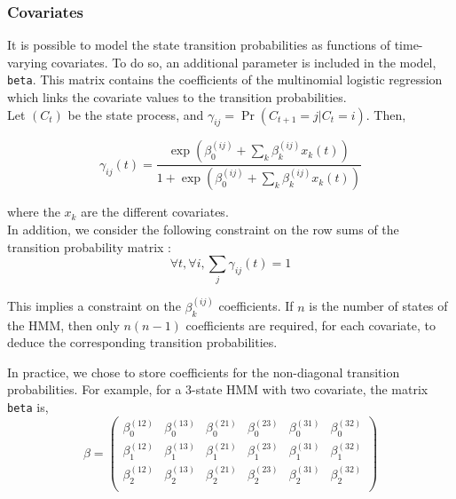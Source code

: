 \documentclass[]{article}
\begin{document}
\subsubsection{Covariates}
It is possible to model the state transition probabilities as functions of time-varying covariates. To do so, an additional parameter is included in the model, \texttt{beta}. This matrix contains the coefficients of the multinomial logistic regression which links the covariate values to the transition probabilities.\\

Let $(C_t)$ be the state process, and $\gamma_{ij} = \Pr(C_{t+1}=j \vert C_t=i)$. Then, 

\begin{equation*}
	\gamma_{ij}(t) = \dfrac{\exp\left(\beta_0^{(ij)} + \sum_k \beta_k^{(ij)} x_k(t)\right)}{1+\exp\left(\beta_0^{(ij)} + \sum_k \beta_k^{(ij)} x_k(t)\right)}
\end{equation*}

where the $x_k$ are the different covariates.\\

In addition, we consider the following constraint on the row sums of the transition probability matrix :
\begin{equation*}
	\forall t, \forall i, \sum_j \gamma_{ij}(t) = 1
\end{equation*}

This implies a constraint on the $\beta_k^{(ij)}$ coefficients. If $n$ is the number of states of the HMM, then only $n(n-1)$ coefficients are required, for each covariate, to deduce the corresponding transition probabilities.

In practice, we chose to store coefficients for the non-diagonal transition probabilities. For example, for a 3-state HMM with two covariate, the matrix \texttt{beta} is,
\begin{equation*}
	\beta =
	\begin{pmatrix}
	\beta_0^{(12)} & \beta_0^{(13)} & \beta_0^{(21)} & \beta_0^{(23)} & \beta_0^{(31)} & \beta_0^{(32)}\\
	\beta_1^{(12)} & \beta_1^{(13)} & \beta_1^{(21)} & \beta_1^{(23)} & \beta_1^{(31)} & \beta_1^{(32)}\\
	\beta_2^{(12)} & \beta_2^{(13)} & \beta_2^{(21)} & \beta_2^{(23)} & \beta_2^{(31)} & \beta_2^{(32)}\\		
	\end{pmatrix}
\end{equation*}
\end{document}
